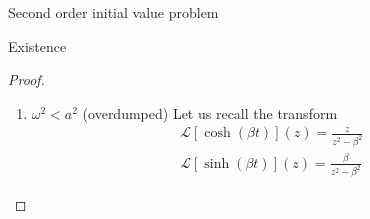 \begin{parag}{Second order initial value problem}
\begin{subparag}{Existence}
\begin{proof}
\begin{enumerate}
							Define $\beta =  \sqrt{\omega^2 - a^2}$ (this is totally legal as we have the hypothesis above). Again let us rewrite the equations in order to make appear the reciprocals 
							\begin{align*} 
								\frac{1}{\left(z + a\right)^2 + \beta^2} &= \frac{1}{\beta}\frac{\beta}{\left(z + a\right)^2 + \beta^2}\\
								&=  \frac{1}{\beta} \mathcal{L}\left[e^{-at}\sin\left(\beta t\right)\right]\left(z\right)
							\end{align*}
							In order to show this we use the frequency shift property that we have state in previous sections. For the other parts of the equations 
							\begin{align*} 
								\frac{z + a}{\left(z + a\right)^2 + \beta^2} = \mathcal{L}\left[e^{-at}\cos\left(\beta t\right)\right]\left(z\right)
							\end{align*}
							This gives us 
							\begin{align*} 
								Y\left(t\right) &= \mathcal{L}\left[\frac{1}{\sqrt{\omega^2 - a^2}}e^{-at}\sin\left(\sqrt{\omega^2 - a^2}t\right)\right]\left(z\right)\mathcal{L}\left[f\right]\left(z\right) \\
												&+ \mathcal{L}\left[e^{-at}\cos\left(\sqrt{\omega^2 - a^2}t\right)\right]\left(z\right)y_0 \\
												&+ \mathcal{L}\left[\frac{1}{\sqrt{\omega^2 - a^2}}e^{-at}\sin\left(\sqrt{\omega^2 - a^2}t\right)\right]\left(z\right)\left(ay_0 + v_0\right)
							\end{align*}
							Therefore 
							\begin{align*} 
								y\left(t\right) &= \int_0^{t} \frac{1}{\sqrt{\omega^2 - a^2}}e^{-a\left(t-s\right)} \sin\left(\sqrt{w^2 - a^2}\left(t-s\right)\right)f\left(s\right)ds \\
												&+ y_0 e^{-at}\cos\left(\sqrt{\omega^2 - a^2}t\right) \\
												&+ \left(ay_0 + v_0\right)\frac{1}{\sqrt{\omega^2 - a^2}}e^{-at}\sin\left(\sqrt{\omega^2 - a^2}t\right)
							\end{align*}
					\item  $\omega^2 < a^2$ (overdumped) Let us recall the transform 
						\begin{align*} 
							\mathcal{L}\left[\cosh\left(\beta t\right)\right]\left(z\right) = \frac{z}{z^2 - \beta^2}\\
							\mathcal{L}\left[\sinh\left(\beta t\right)\right]\left(z\right) =  \frac{\beta}{z^2 - \beta^2}
						\end{align*}

\end{enumerate}
\end{proof}
\end{subparag}
\end{parag}
